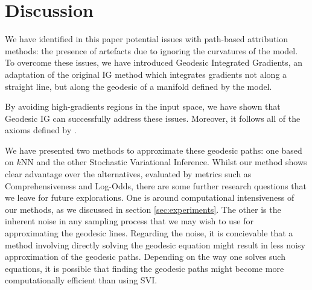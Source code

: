 \section{Discussion}
\label{sec:discussion}

We have identified in this paper potential issues with path-based attribution methods: the presence of artefacts due to ignoring the curvatures of the model. To overcome these issues, we have introduced Geodesic Integrated Gradients, an adaptation of the original IG method which integrates gradients not along a straight line, but along the geodesic of a manifold defined by the model.

By avoiding high-gradients regions in the input space, we have shown that Geodesic IG can successfully address these issues. Moreover, it follows all of the axioms defined by \citet{sundararajan2017axiomatic}. 

We have presented two methods to approximate these geodesic paths: one based on $k$NN and the other Stochastic Variational Inference. Whilst our method shows clear advantage over the alternatives, evaluated by metrics such as Comprehensiveness and Log-Odds, there are some further research questions that we leave for future explorations. One is around computational intensiveness of our methods, as we discussed in section \ref{sec:experiments}. The other is the inherent noise in any sampling process that we may wish to use for approximating the geodesic lines. Regarding the noise, it is concievable that a method involving directly solving the geodesic equation might result in less noisy approximation of the geodesic paths. Depending on the way one solves such equations, it is possible that finding the geodesic paths might become more computationally efficient than using SVI. 